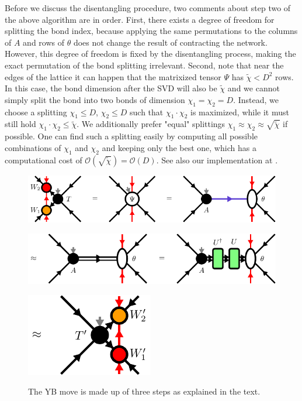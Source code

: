Before we discuss the disentangling procedure, two comments about step two of the above algorithm are in order. First, there exists a degree of freedom for splitting the bond index, because applying the same permutations to the columns of $A$ and rows of $\theta$ does not change the result of contracting the network. However, this degree of freedom is fixed by the disentangling process, making the exact permutation of the bond splitting irrelevant. Second, note that near the edges of the lattice it can happen that the matrixized tensor $\Psi$ has $\tilde{\chi} < D^2$ rows. In this case, the bond dimension after the SVD will also be $\tilde{\chi}$ and we cannot simply split the bond into two bonds of dimension $\chi_1=\chi_2=D$. Instead, we choose a splitting $\chi_1 \le D$, $\chi_2 \le D$ such that $\chi_1\cdot\chi_2$ is maximized, while it must still hold $\chi_1\cdot\chi_2\le\tilde{\chi}$. We additionally prefer "equal" splittings $\chi_1\approx\chi_2\approx\sqrt{\tilde{\chi}}$ if possible. One can find such a splitting easily by computing all possible combinations of $\chi_1$ and $\chi_2$ and keeping only the best one, which has a computational cost of $\mathcal{O}\left(\sqrt{\tilde{\chi}}\right) = \mathcal{O}\left(D\right)$. See also our implementation at \cite{cite:github_YB_isoTPS}.\par
\begin{figure}
	\centering
	\subcaptionbox{\label{fig:yb_move_svd_disent_a}}
	{%
		\includegraphics[scale=1.0]{figures/tikz/YB_isoTPS/yang_baxter_move_svd/yang_baxter_move_svd_a.pdf}
	}
	\par\bigskip
	\subcaptionbox{\label{fig:yb_move_svd_disent_b}}
	{%
		\includegraphics[scale=1.0]{figures/tikz/YB_isoTPS/yang_baxter_move_svd/yang_baxter_move_svd_b.pdf}
	}
	\par\bigskip
	\subcaptionbox{\label{fig:yb_move_svd_disent_c}}
	{%
		\includegraphics[scale=1.0]{figures/tikz/YB_isoTPS/yang_baxter_move_svd/yang_baxter_move_svd_c.pdf}
	}
	\caption{The YB move is made up of three steps as explained in the text.}
	\label{fig:yb_move_svd_disent}
\end{figure}

